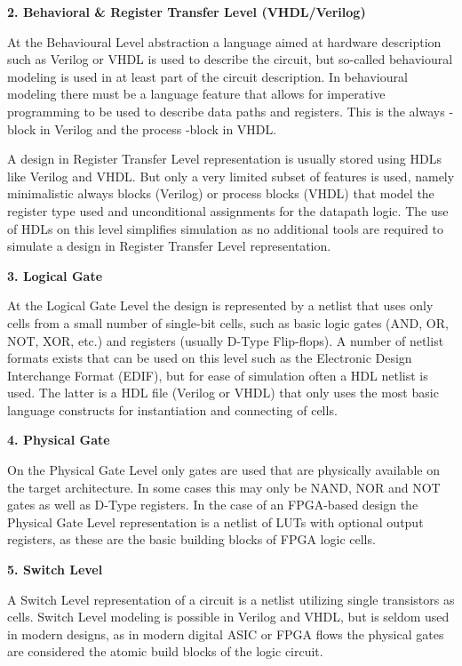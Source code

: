 \documentclass[
]{article}
\begin{document}
\textbf{2. Behavioral \& Register Transfer Level (VHDL/Verilog)}

At the Behavioural Level abstraction a language aimed at hardware
description such as Verilog or VHDL is used to describe the circuit, but
so-called behavioural modeling is used in at least part of the circuit
description. In behavioural modeling there must be a language feature
that allows for imperative programming to be used to describe data paths
and registers. This is the always -block in Verilog and the process
-block in VHDL.

A design in Register Transfer Level representation is usually stored
using HDLs like Verilog and VHDL. But only a very limited subset of
features is used, namely minimalistic always blocks (Verilog) or process
blocks (VHDL) that model the register type used and unconditional
assignments for the datapath logic. The use of HDLs on this level
simplifies simulation as no additional tools are required to simulate a
design in Register Transfer Level representation.

\textbf{3. Logical Gate}

At the Logical Gate Level the design is represented by a netlist that
uses only cells from a small number of single-bit cells, such as basic
logic gates (AND, OR, NOT, XOR, etc.) and registers (usually D-Type
Flip-flops). A number of netlist formats exists that can be used on this
level such as the Electronic Design Interchange Format (EDIF), but for
ease of simulation often a HDL netlist is used. The latter is a HDL file
(Verilog or VHDL) that only uses the most basic language constructs for
instantiation and connecting of cells.

\textbf{4. Physical Gate}

On the Physical Gate Level only gates are used that are physically
available on the target architecture. In some cases this may only be
NAND, NOR and NOT gates as well as D-Type registers. In the case of an
FPGA-based design the Physical Gate Level representation is a netlist of
LUTs with optional output registers, as these are the basic building
blocks of FPGA logic cells.

\textbf{5. Switch Level}

A Switch Level representation of a circuit is a netlist utilizing single
transistors as cells. Switch Level modeling is possible in Verilog and
VHDL, but is seldom used in modern designs, as in modern digital ASIC or
FPGA flows the physical gates are considered the atomic build blocks of
the logic circuit.
\end{document}

